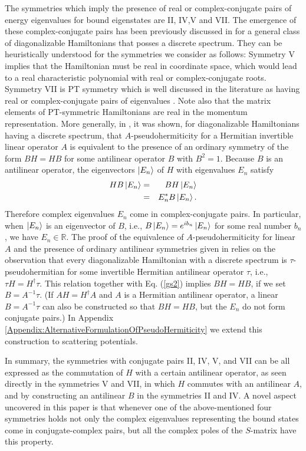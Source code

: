 The symmetries which imply the presence of real or complex-conjugate pairs of energy eigenvalues for bound eigenstates
are II, IV,V and VII.
The emergence of these complex-conjugate pairs has been previously discussed in \cite{Mostafazadeh2002,Bender2010} for a general class of diagonalizable Hamiltonians that posses a discrete spectrum. They can be heuristically understood for the symmetries we consider as follows: Symmetry V implies that the Hamiltonian must be real in coordinate space, which would lead to a real characteristic polynomial with real or complex-conjugate roots. Symmetry VII is PT symmetry which is well discussed in the literature as having real or complex-conjugate pairs of eigenvalues \cite{Bender1998}. Note also that the matrix elements of PT-symmetric Hamiltonians are real in the momentum representation. More generally, in \cite{Mostafazadeh2002b}, it was shown, for diagonalizable Hamiltonians having a discrete spectrum, that $A$-pseudohermiticity for a Hermitian invertible linear operator $A$ is equivalent to the presence of an ordinary symmetry of the form $BH = HB$ for some antilinear operator $B$ with $B^2 = 1$. Because $B$ is an antilinear operator, the eigenvectors $\ket{E_n}$  of $H$ with eigenvalues $E_n$ satisfy
%
\begin{eqnarray}
H B \ket{E_n}&=&B H \ket{E_n} \nonumber \\
				   &=&E_{n}^{*} B \ket{E_n}.
\end{eqnarray}
%
Therefore complex eigenvalues $E_n$ come in complex-conjugate pairs. In particular, when $\ket{E_n}$  is an eigenvector of $B$, i.e., $B\ket{E_n} = e^{ib_n} \ket{E_n}$ for some real number $b_n$, we have $E_n \in \mathbb{R}$.
The proof of the equivalence of $A$-pseudohermiticity for linear $A$ and the presence of ordinary antilinear symmetries given in \cite{Mostafazadeh2002b} relies on the observation that every diagonalizable Hamiltonian with a discrete spectrum is $\tau$-pseudohermitian for some invertible Hermitian antilinear operator $\tau$, i.e.,
$\tau H = H^\dagger\tau$. This relation together with Eq. (\ref{gs2}) implies $BH = HB$,
if we set $B = A^{-1}\tau$. (If $AH=H^\dagger A$ and $A$ is a Hermitian antilinear operator, a linear $B = A^{-1}\tau$ can also be constructed so that $BH=HB$, but the $E_n$ do not form conjugate pairs.)
In Appendix \ref{Appendix:AlternativeFormulationOfPseudoHermiticity} we extend this construction to scattering potentials.

In summary, the symmetries with conjugate pairs II, IV, V, and VII can be all expressed as the commutation of $H$ with a certain antilinear operator, as seen directly in the symmetries V and VII, in which $H$ commutes with an antilinear $A$,  and by constructing an antilinear $B$ in the symmetries II and IV.
A novel aspect uncovered in this paper is that whenever one of  the above-mentioned four symmetries holds not only the complex eigenvalues representing the bound states come in conjugate-complex pairs, but all the complex poles of the $S$-matrix have this property.

